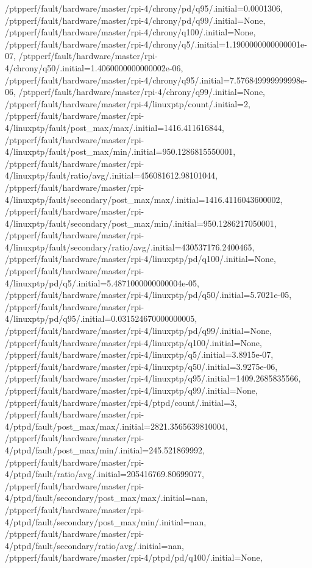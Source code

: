 {    /ptpperf/fault/hardware/master/rpi-4/chrony/pd/q95/.initial=0.0001306,
    /ptpperf/fault/hardware/master/rpi-4/chrony/pd/q99/.initial=None,
    /ptpperf/fault/hardware/master/rpi-4/chrony/q100/.initial=None,
    /ptpperf/fault/hardware/master/rpi-4/chrony/q5/.initial=1.1900000000000001e-07,
    /ptpperf/fault/hardware/master/rpi-4/chrony/q50/.initial=1.4060000000000002e-06,
    /ptpperf/fault/hardware/master/rpi-4/chrony/q95/.initial=7.576849999999998e-06,
    /ptpperf/fault/hardware/master/rpi-4/chrony/q99/.initial=None,
    /ptpperf/fault/hardware/master/rpi-4/linuxptp/count/.initial=2,
    /ptpperf/fault/hardware/master/rpi-4/linuxptp/fault/post_max/max/.initial=1416.411616844,
    /ptpperf/fault/hardware/master/rpi-4/linuxptp/fault/post_max/min/.initial=950.1286815550001,
    /ptpperf/fault/hardware/master/rpi-4/linuxptp/fault/ratio/avg/.initial=456081612.98101044,
    /ptpperf/fault/hardware/master/rpi-4/linuxptp/fault/secondary/post_max/max/.initial=1416.4116043600002,
    /ptpperf/fault/hardware/master/rpi-4/linuxptp/fault/secondary/post_max/min/.initial=950.1286217050001,
    /ptpperf/fault/hardware/master/rpi-4/linuxptp/fault/secondary/ratio/avg/.initial=430537176.2400465,
    /ptpperf/fault/hardware/master/rpi-4/linuxptp/pd/q100/.initial=None,
    /ptpperf/fault/hardware/master/rpi-4/linuxptp/pd/q5/.initial=5.4871000000000004e-05,
    /ptpperf/fault/hardware/master/rpi-4/linuxptp/pd/q50/.initial=5.7021e-05,
    /ptpperf/fault/hardware/master/rpi-4/linuxptp/pd/q95/.initial=0.031524670000000005,
    /ptpperf/fault/hardware/master/rpi-4/linuxptp/pd/q99/.initial=None,
    /ptpperf/fault/hardware/master/rpi-4/linuxptp/q100/.initial=None,
    /ptpperf/fault/hardware/master/rpi-4/linuxptp/q5/.initial=3.8915e-07,
    /ptpperf/fault/hardware/master/rpi-4/linuxptp/q50/.initial=3.9275e-06,
    /ptpperf/fault/hardware/master/rpi-4/linuxptp/q95/.initial=1409.2685835566,
    /ptpperf/fault/hardware/master/rpi-4/linuxptp/q99/.initial=None,
    /ptpperf/fault/hardware/master/rpi-4/ptpd/count/.initial=3,
    /ptpperf/fault/hardware/master/rpi-4/ptpd/fault/post_max/max/.initial=2821.3565639810004,
    /ptpperf/fault/hardware/master/rpi-4/ptpd/fault/post_max/min/.initial=245.521869992,
    /ptpperf/fault/hardware/master/rpi-4/ptpd/fault/ratio/avg/.initial=205416769.80699077,
    /ptpperf/fault/hardware/master/rpi-4/ptpd/fault/secondary/post_max/max/.initial=nan,
    /ptpperf/fault/hardware/master/rpi-4/ptpd/fault/secondary/post_max/min/.initial=nan,
    /ptpperf/fault/hardware/master/rpi-4/ptpd/fault/secondary/ratio/avg/.initial=nan,
    /ptpperf/fault/hardware/master/rpi-4/ptpd/pd/q100/.initial=None,
}
